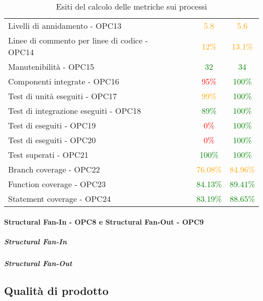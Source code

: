 \documentclass[PdQ.tex]{subfiles}
\begin{document}
\begin{table}[H]
\begin{tabular}{l c c c c}
					\rule[0cm]{0cm}{0.4cm}
					Livelli di annidamento - OPC13 & & & \textcolor{orange}{5.8} & \textcolor{orange}{5.6}\\
					\rule[0cm]{0cm}{0.4cm}
					Linee di commento per linee di codice - OPC14 & & & \textcolor{orange}{12\%} & \textcolor{orange}{13.1\%} \\
					\rule[0cm]{0cm}{0.4cm}
					Manutenibilità - OPC15 & & & \textcolor{green}{32} & \textcolor{green}{34} \\
					\rule[0cm]{0cm}{0.4cm}
					Componenti integrate - OPC16 & & & \textcolor{red}{95\%} & \textcolor{green}{100\%} \\
					\rule[0cm]{0cm}{0.4cm}
					Test di unità eseguiti - OPC17 & & & \textcolor{orange}{99\%} & \textcolor{green}{100\%} \\
					\rule[0cm]{0cm}{0.4cm}
					Test di integrazione eseguiti - OPC18 & & & \textcolor{green}{89\%} & \textcolor{green}{100\%} \\
					\rule[0cm]{0cm}{0.4cm}
					Test di \gl{sistema} eseguiti - OPC19 & & & \textcolor{red}{0\%} & \textcolor{green}{100\%} \\
					\rule[0cm]{0cm}{0.4cm}
					Test di \gl{validazione} eseguiti - OPC20 & & & \textcolor{red}{0\%} & \textcolor{green}{100\%} \\
					\rule[0cm]{0cm}{0.4cm}
					Test superati - OPC21 & & & \textcolor{green}{100\%} & \textcolor{green}{100\%} \\
					\rule[0cm]{0cm}{0.4cm}
					Branch coverage - OPC22 & & & \textcolor{orange}{76.08\%} & \textcolor{orange}{84.96\%} \\
					\rule[0cm]{0cm}{0.4cm}
					Function coverage - OPC23 & & & \textcolor{green}{84.13\%} & \textcolor{green}{89.41\%} \\
					\rule[0cm]{0cm}{0.4cm}
					Statement coverage - OPC24 & & & \textcolor{green}{83.19\%} & \textcolor{green}{88.65\%} \\

					\hline
				\end{tabular}
				\caption{Esiti del calcolo delle metriche sui processi}
			\end{table}
		\newpage
		\paragraph{Structural Fan-In - OPC8 e Structural Fan-Out - OPC9}
		\subparagraph{Structural Fan-In}
		
		\subparagraph{Structural Fan-Out}
		

\newpage
\subsection{Qualità di prodotto}
\end{document}
